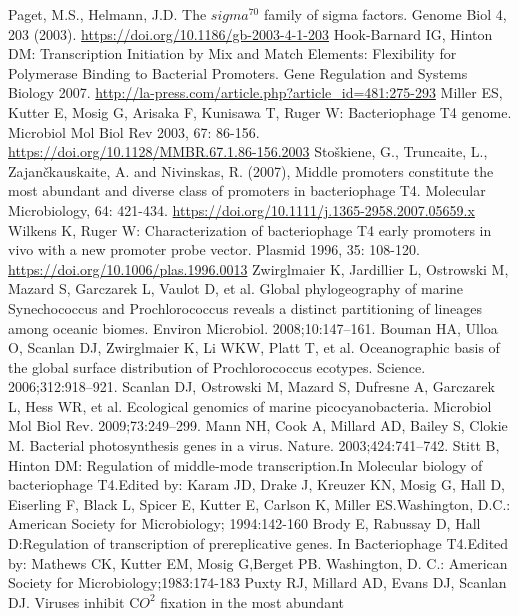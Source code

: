 \documentclass[14pt]{extarticle}
\begin{document}
\begin{thebibliography}{9}
     Paget, M.S., Helmann, J.D. The $ sigma^70 $ family of sigma factors. Genome Biol 4, 203 (2003). \url{https://doi.org/10.1186/gb-2003-4-1-203}
     Hook-Barnard IG, Hinton DM: Transcription Initiation by Mix and Match Elements: Flexibility for 
    Polymerase Binding to Bacterial Promoters. Gene Regulation and Systems Biology 2007. 
    \url{http://la-press.com/article.php?article\_id=481:275-293}
     Miller ES, Kutter E, Mosig G, Arisaka F, Kunisawa T, Ruger W: Bacteriophage T4 genome. Microbiol Mol 
    Biol Rev 2003, 67: 86-156. \url{https://doi.org/10.1128/MMBR.67.1.86-156.2003}
     Stoškiene, G., Truncaite, L., Zajančkauskaite, A. and Nivinskas, R. (2007), Middle promoters constitute the most abundant and diverse class of promoters in bacteriophage T4. Molecular Microbiology, 64: 421-434. \url{https://doi.org/10.1111/j.1365-2958.2007.05659.x}
     Wilkens K, Ruger W: Characterization of bacteriophage T4 early promoters in vivo with a new promoter 
    probe vector. Plasmid 1996, 35: 108-120. \url{https://doi.org/10.1006/plas.1996.0013}
     Zwirglmaier K, Jardillier L, Ostrowski M, Mazard S, Garczarek L, Vaulot D, et al. Global phylogeography
    of marine Synechococcus and Prochlorococcus reveals a distinct partitioning of lineages among oceanic biomes.
    Environ Microbiol. 2008;10:147–161.
     Bouman HA, Ulloa O, Scanlan DJ, Zwirglmaier K, Li WKW, Platt T, et al. Oceanographic basis of the 
    global surface distribution of Prochlorococcus ecotypes. Science. 2006;312:918–921.
     Scanlan DJ, Ostrowski M, Mazard S, Dufresne A, Garczarek L, Hess WR, et al. Ecological genomics of 
    marine picocyanobacteria. Microbiol Mol Biol Rev. 2009;73:249–299.
     Mann NH, Cook A, Millard AD, Bailey S, Clokie M. Bacterial photosynthesis genes in a virus. Nature. 
    2003;424:741–742.
     {Stitt B, Hinton DM: Regulation of middle-mode transcription.In Molecular biology  of  
    bacteriophage  T4.Edited by: Karam JD, Drake J, Kreuzer KN, Mosig G, Hall D, Eiserling F, Black L, Spicer E, Kutter 
    E, Carlson K, Miller ES.Washington, D.C.: American Society for Microbiology; 1994:142-160}
     {Brody E, Rabussay D, Hall D:Regulation of transcription of prereplicative genes. In Bacteriophage
    T4.Edited by: Mathews CK, Kutter EM, Mosig G,Berget PB. Washington, D. C.: American Society for 
    Microbiology;1983:174-183}
     Puxty RJ, Millard AD, Evans DJ, Scanlan DJ. Viruses inhibit C$ O^2 $ fixation in the most abundant 

\end{thebibliography}
\end{document}

